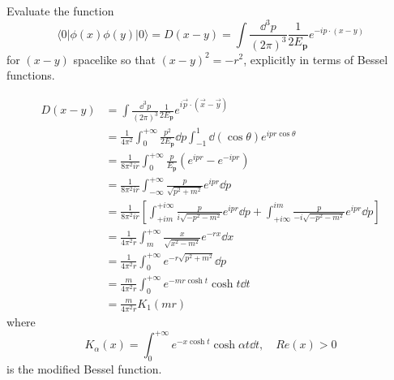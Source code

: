\problem Evaluate the function
\begin{equation*}
    \langle 0 | \phi(x) \phi(y) |0 \rangle = D(x - y) = \int \frac{\dd^3p}{(2\pi)^3} \frac{1}{2E_\mathbf{p}} e^{-ip \cdot (x - y)}
\end{equation*}
for $(x - y)$ spacelike so that $(x - y)^2 = -r^2$, explicitly in terms of Bessel functions.

\solution
\begin{align*}
    D(x - y) & = \int \frac{\dd^3p}{(2\pi)^3} \frac{1}{2E_{\mathbf{p}}} e^{i\vec{p}\cdot(\vec{x} - \vec{y})}\\
    & = \frac{1}{4\pi^2} \int_0^{+\infty} \frac{p^2}{2E_{\mathbf{p}}} \dd p \int_{-1}^1 \dd (\cos\theta) e^{ipr\cos\theta}\\
    & = \frac{1}{8\pi^2ir} \int_0^{+\infty} \frac{p}{E_{\mathbf{p}}} \left(e^{ipr} - e^{-ipr}\right)\\
    & = \frac{1}{8\pi^2ir} \int_{-\infty}^{+\infty} \frac{p}{\sqrt{p^2 + m^2}} e^{ipr} \dd p\\
    & = \frac{1}{8\pi^2ir} \left[\int_{+im}^{+i\infty} \frac{p}{i\sqrt{-p^2 - m^2}} e^{ipr} \dd p + \int_{+i\infty}^{im} \frac{p}{-i\sqrt{-p^2 - m^2}} e^{ipr} \dd p \right]\\
    & = \frac{1}{4\pi^2r} \int_m^{+\infty} \frac{x}{\sqrt{x^2 - m^2}} e^{-rx} \dd x\\
    & = \frac{1}{4\pi^2r} \int_0^{+\infty} e^{-r\sqrt{p^2 + m^2}} \dd p\\
    & = \frac{m}{4\pi^2r} \int_0^{+\infty} e^{-mr\cosh t} \cosh t \dd t\\
    & = \frac{m}{4\pi^2r} K_1(mr)
\end{align*}
where 
\begin{equation*}
    K_\alpha(x) = \int_0^{+\infty} e^{-x\cosh t} \cosh{\alpha t} \dd t, \quad Re(x) > 0
\end{equation*}
is the modified Bessel function.